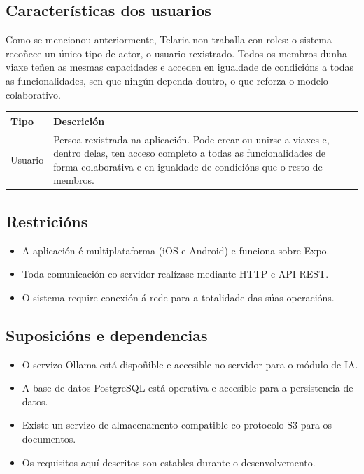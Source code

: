 \subsection{Características dos usuarios}

Como se mencionou anteriormente, Telaria non traballa con roles: o sistema 
recoñece un único tipo de actor, o usuario rexistrado. Todos os membros dunha 
viaxe teñen as mesmas capacidades e acceden en igualdade de condicións a todas 
as funcionalidades, sen que ningún dependa doutro, o que reforza o modelo 
colaborativo.

\vspace{0.5em}
\begin{tabularx}{\textwidth}{@{}lX@{}}
  \toprule
  \textbf{Tipo} & \textbf{Descrición} \\
  \midrule
  Usuario & Persoa rexistrada na aplicación. Pode crear ou unirse a viaxes e, dentro delas, ten acceso completo a todas as funcionalidades de forma colaborativa e en igualdade de condicións que o resto de membros. \\
  \bottomrule
\end{tabularx}

\subsection{Restricións}

\begin{itemize}
  \item A aplicación é multiplataforma (iOS e Android) e funciona sobre Expo.
  \item Toda comunicación co servidor realízase mediante HTTP e API REST.
  \item O sistema require conexión á rede para a totalidade das súas operacións.
\end{itemize}

\subsection{Suposicións e dependencias}

\begin{itemize}
  \item O servizo Ollama está dispoñible e accesible no servidor para o módulo de IA.
  \item A base de datos PostgreSQL está operativa e accesible para a persistencia de datos.
  \item Existe un servizo de almacenamento compatible co protocolo S3 para os documentos.
  \item Os requisitos aquí descritos son estables durante o desenvolvemento.
\end{itemize}

